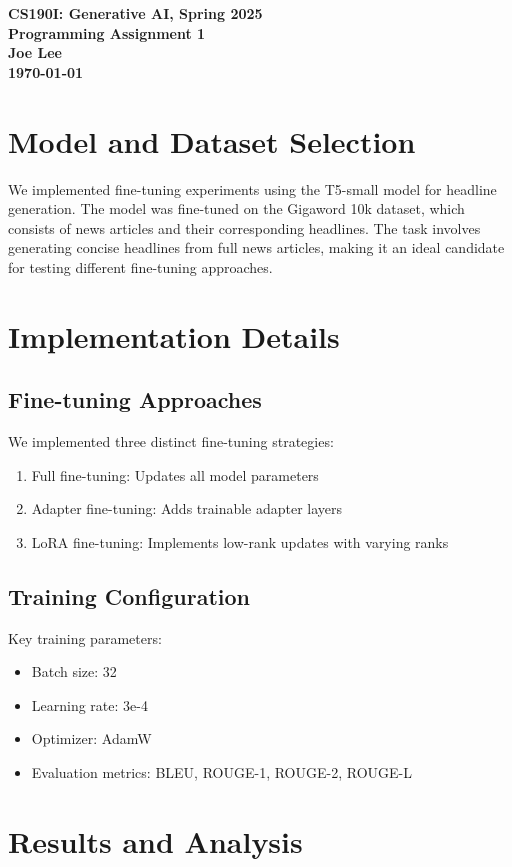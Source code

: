 \documentclass[conference]{IEEEtran}
\renewcommand{\maketitle}{%
  \begin{center}
    {\bfseries\large CS190I: Generative AI, Spring 2025\\
    Programming Assignment 1\\
    \normalsize Joe Lee\\
    \today}
  \end{center}
}
\begin{document}
\maketitle

\section{Model and Dataset Selection}
We implemented fine-tuning experiments using the T5-small model \cite{raffel2020exploring} for headline generation. The model was fine-tuned on the Gigaword 10k dataset, which consists of news articles and their corresponding headlines. The task involves generating concise headlines from full news articles, making it an ideal candidate for testing different fine-tuning approaches.

\section{Implementation Details}

\subsection{Fine-tuning Approaches}
We implemented three distinct fine-tuning strategies:

\begin{enumerate}
    \item Full fine-tuning: Updates all model parameters
    \item Adapter fine-tuning: Adds trainable adapter layers
    \item LoRA fine-tuning: Implements low-rank updates with varying ranks
\end{enumerate}

\subsection{Training Configuration}
Key training parameters:
\begin{itemize}
    \item Batch size: 32
    \item Learning rate: 3e-4
    \item Optimizer: AdamW
    \item Evaluation metrics: BLEU, ROUGE-1, ROUGE-2, ROUGE-L
\end{itemize}

\section{Results and Analysis}
\end{document}

